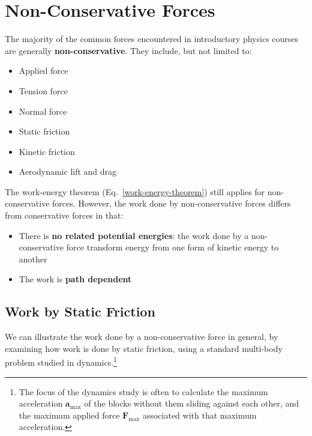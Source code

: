 %
%


\section{Non-Conservative Forces}
The majority of the common forces encountered in introductory physics courses
are generally \textbf{non-conservative}. They include, but not limited to:
\begin{itemize}[nosep]
\item Applied force
\item Tension force
\item Normal force
\item Static friction
\item Kinetic friction
\item Aerodynamic lift and drag 
\end{itemize}
The work-energy theorem (Eq.~\ref{work-energy-theorem}) still applies for
non-conservative forces. However, the work done by non-conservative forces
differs from conservative forces in that:
\begin{itemize}[leftmargin=12pt,itemsep=4pt]
\item There is \textbf{no related potential energies}: the work done by a
  non-conservative force transform energy from one form of kinetic energy to
  another
\item The work is \textbf{path dependent}
\end{itemize}


\subsection{Work by Static Friction}
We can illustrate the work done by a non-conservative force in general, by
examining how work is done by static friction, using a standard multi-body
problem studied in dynamics.\footnote{The focus of the dynamics study is often
to calculate the maximum acceleration $\bm a_\text{max}$ of the blocks
without them sliding against each other, and the maximum applied force
$\bm F_\text{max}$ associated with that maximum acceleration.}


